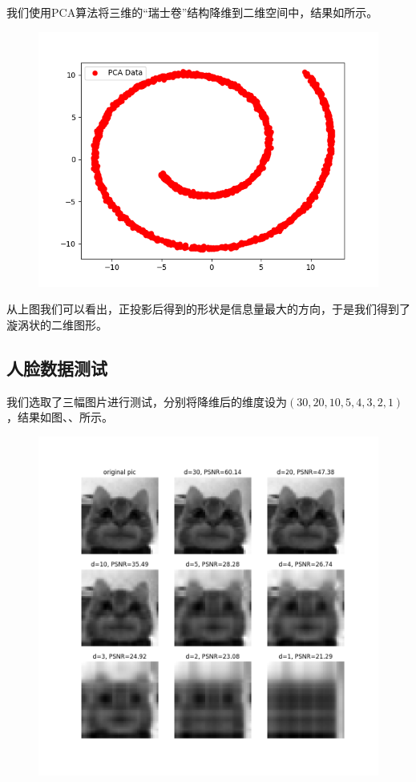 \documentclass[lang=cn,11pt,a4paper,cite=authoryear]{elegantpaper}
\begin{document}
我们使用PCA算法将三维的“瑞士卷”结构降维到二维空间中，结果如所示。

\begin{figure}[H]
	\centering
	\includegraphics[width=0.7\linewidth]{images/ml_lab4_2.png}
	\caption{}
	\label{fig:mllab42}
\end{figure}

从上图我们可以看出，正投影后得到的形状是信息量最大的方向，于是我们得到了漩涡状的二维图形。

\subsection{人脸数据测试}

我们选取了三幅图片进行测试，分别将降维后的维度设为$(30, 20, 10, 5, 4, 3, 2, 1)$，结果如图、、所示。

\begin{figure}[H]
	\centering
	\includegraphics[width=0.6\linewidth]{images/ml_lab4_3.png}
	\caption{}
	\label{fig:mllab43}
\end{figure}
\end{document}
